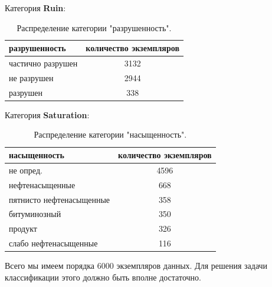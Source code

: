 \documentclass[14pt]{matmex-diploma}
\begin{document}
        Категория \textbf{Ruin}:
        
        \begin{table}[h!]
            \centering
            \begin{tabular}{|l|c|}
                \hline
                \textbf{разрушенность}            & \textbf{количество экземпляров} \\
                \hline
                частично разрушен &  3132 \\
                \hline
                не разрушен       &  2944 \\
                \hline
                разрушен          &   338 \\
                \hline
            \end{tabular}    
            \caption{Распределение категории "разрушенность".}
            \label{table_ruin}
        \end{table}
        
        \vskip 0.2in
        
        Категория \textbf{Saturation}:
        
        \begin{table}[h!]
            \centering
            \begin{tabular}{|l|c|}
                \hline
                \textbf{насыщенность}            & \textbf{количество экземпляров} \\
                \hline
                не опред.                &        4596 \\
                \hline
                нефтенасыщенные          &         668 \\
                \hline
                пятнисто нефтенасыщенные &         358 \\
                \hline
                битуминозный             &         350 \\
                \hline
                продукт                  &         326 \\
                \hline
                слабо нефтенасыщенные    &         116 \\
                \hline
            \end{tabular}    
            \caption{Распределение категории "насыщенность".}
            \label{table_saturation}  
        \end{table}
    
    Всего мы имеем порядка 6000 экземпляров данных. Для решения задачи классификации этого должно быть вполне достаточно.
        
\end{document}
